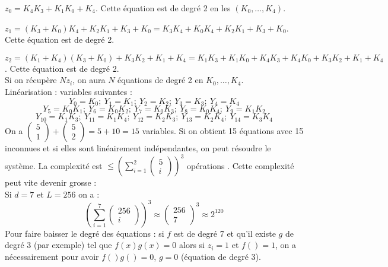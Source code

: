 \documentclass[12pt,a4paper]{report}
\begin{document}
$z_0 = K_4K_3+K_1K_0+K_4$. Cette équation est de degré 2 en les $(K_0,\ldots,K_4)$.\\

\begin{figure}[h!]
	\centering
  \scalebox{0.6}{}	
\end{figure}

$z_1 = (K_3+K_0)K_4+K_2K_1+K_3+K_0 = K_3K_4+K_0K_4+K_2K_1+K_3+K_0$. Cette équation est de degré 2.\\

\begin{figure}[h!]
	\centering
  \scalebox{0.6}{}	
\end{figure}

$z_2 = (K_1+K_4)(K_3+K_0)+K_3K_2+K_1+K_4 = K_1K_3+K_1K_0+K_4K_3+K_4K_0+K_3K_2+K_1+K_4$. Cette équation est de degré 2.\\
Si on récupère $N z_i$, on aura $N$ équations de degré 2 en $K_0,\ldots,K_4$. \\
Linéarisation : variables suivantes  :
$$Y_0= K_0 ;\  Y_1 = K_1 ;\  Y_2=K_2;\  Y_3=K_3; \  Y_4=K_4$$
$$Y_5= K_0K_1 ;\  Y_6= K_0K_2 ;\  Y_7= K_0K_3 ;\  Y_8= K_0K_4 ;\   Y_9 = K_1K_2  $$
$$  Y_{10} = K_1K_3 ;\   Y_{11} = K_1K_4 ;\  Y_{12}=K_2K_3 ;\  Y_{13}=K_2K_4 ;\  Y_{14}=K_3K_4 $$
On a $\left(\begin{array}{c} 5 \\ 1  \end{array} \right) + \left(\begin{array}{c} 5 \\ 2 \end{array} \right) = 5+10=15 $ variables. Si on obtient 15 équations avec 15 inconnues et si elles sont linéairement indépendantes, on peut résoudre le système. La complexité est $\leqslant \left(\displaystyle \sum_{i=1}^2 \left(\begin{array}{c} 5 \\ i  \end{array} \right)\right)^3 $ opérations .
Cette complexité peut vite devenir grosse :\\
Si $d=7$ et $L=256$ on a : $$\left(\displaystyle \sum_{i=1}^7 \left(\begin{array}{c} 256 \\ i  \end{array} \right)\right)^3 \approx \left(\begin{array}{c} 256 \\ 7 \end{array} \right)^3 \approx 2^{120}$$
Pour faire baisser le degré des équations : si $f$ est de degré 7 et qu'il existe $g$ de degré 3 (par exemple) tel que $f(x)g(x) = 0$ alors  si $z_i=1$ et $f()=1$, on a nécessairement pour avoir $f()g() =0$, $g=0$ (équation de degré 3).
\end{document}
